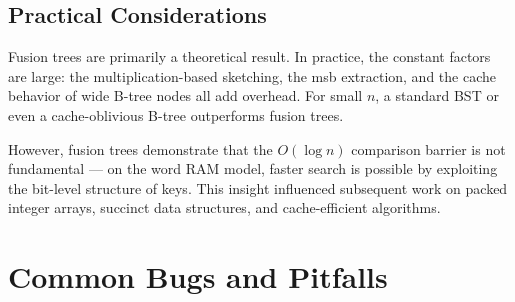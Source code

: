\subsection{Practical Considerations}

Fusion trees are primarily a theoretical result. In practice, the constant factors are large: the multiplication-based sketching, the msb extraction, and the cache behavior of wide B-tree nodes all add overhead. For small $n$, a standard BST or even a cache-oblivious B-tree outperforms fusion trees.

However, fusion trees demonstrate that the $O(\log n)$ comparison barrier is not fundamental --- on the word RAM model, faster search is possible by exploiting the bit-level structure of keys. This insight influenced subsequent work on packed integer arrays, succinct data structures, and cache-efficient algorithms.

\section{Common Bugs and Pitfalls}

